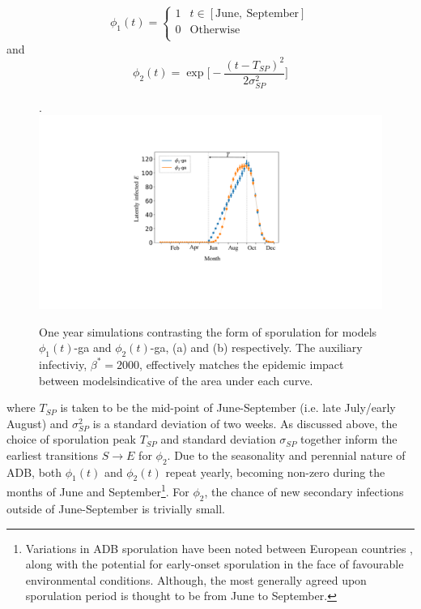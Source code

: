 \begin{equation}
\phi_1(t)  = \left\{
\begin{array}{ll}
      1 &  t \in [\mathrm{June,\ September}] \\
      0 & \mathrm{Otherwise} \\
\end{array} 
\right.
\end{equation}
and 
\begin{equation}
     \phi_2(t) =  \exp\big[-\frac{(t - T_{SP})^2}{2\sigma_{SP}^2}\big]
\end{equation}

\begin{figure}.
    \centering
    \includegraphics[scale=0.35]{chapter6/figures/fig5-sporulation.pdf}
    \caption{One year simulations contrasting the form of sporulation for models $\phi_1(t)$-ga and $\phi_2(t)$-ga, (a) and (b) respectively. The auxiliary infectiviy, $\beta^*=2000$, effectively matches the epidemic impact between models\textemdash indicative of the area under each curve.}
    \label{fig:SEIR-sporulation}
\end{figure}

where $T_{SP}$ is taken to be the mid-point of June-September (i.e. late July/early August) and $\sigma_{SP}^2$ is a standard deviation of two weeks.
As discussed above, the choice of sporulation peak $T_{SP}$ and standard deviation $\sigma_{SP}$ together inform the earliest transitions $S\rightarrow E$ for $\phi_2$.
Due to the seasonality and perennial nature of ADB, both $\phi_1(t)$ and $\phi_2(t)$ repeat yearly, becoming non-zero during the months of June and September\footnote{Variations in ADB sporulation have been noted between European countries \cite{https://doi.org/10.1111/mpp.12073}, along with the potential for early-onset sporulation in the face of favourable environmental conditions. Although, the most generally agreed upon sporulation period is thought to be from June to September.}.
For $\phi_2$, the chance of new secondary infections outside of June-September is trivially small.

